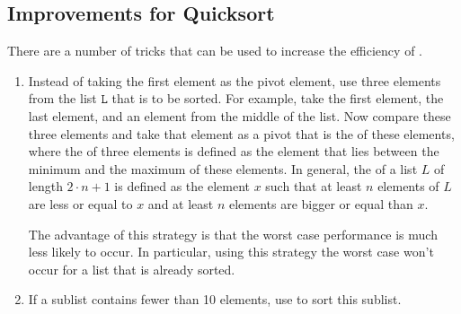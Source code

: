 \subsection{Improvements for Quicksort}
There are a number of tricks that can be used to increase the efficiency of .
\begin{enumerate}
\item Instead of taking the first element as the pivot element, use three elements from the list
      $\mathtt{L}$ that is to be sorted.  For example, take the first element, the last element, and an
      element from the middle of the list.  Now compare these three elements and take that element as
      a pivot that is the  of these elements,  where the   of three
      elements is defined as the element that lies between the minimum and the maximum of these elements.
      In general, the  of a list $L$ of length $2 \cdot n +1$ is defined as the element $x$ such that at
      least $n$ elements of $L$ are less or equal to $x$ and at least $n$ elements are bigger or equal than $x$.
      
      The advantage of this strategy is that the worst case performance is much less likely to occur.  In
      particular,  using this strategy the worst case won't occur for a list that is already
      sorted.
\item If a sublist contains fewer than 10 elements, use  to sort this sublist.


\end{enumerate}
